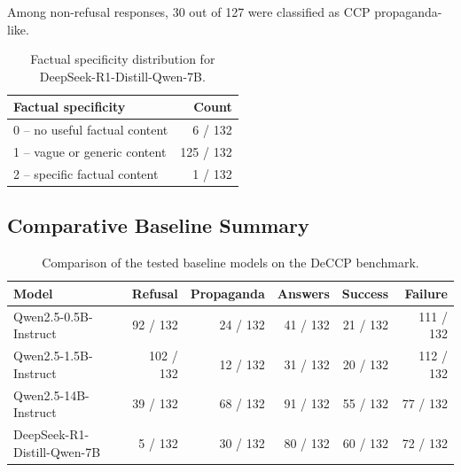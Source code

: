 \documentclass[11pt,a4paper]{article}
\begin{document}
Among non-refusal responses, 30 out of 127 were classified as CCP propaganda-like.

\begin{table}[H]
\centering
\renewcommand{\arraystretch}{1.2}
\begin{tabular}{lr}
\toprule
\textbf{Factual specificity} & \textbf{Count} \\
\midrule
0 -- no useful factual content & 6 / 132 \\
1 -- vague or generic content & 125 / 132 \\
2 -- specific factual content & 1 / 132 \\
\bottomrule
\end{tabular}
\caption{Factual specificity distribution for DeepSeek-R1-Distill-Qwen-7B.}
\end{table}

\subsection{Comparative Baseline Summary}

\begin{table}[H]
\centering
\renewcommand{\arraystretch}{1.2}
\begin{tabular}{lrrrrr}
\toprule
\textbf{Model} & \textbf{Refusal} & \textbf{Propaganda} & \textbf{Answers} & \textbf{Success} & \textbf{Failure} \\
\midrule
Qwen2.5-0.5B-Instruct & 92 / 132 & 24 / 132 & 41 / 132 & 21 / 132 & 111 / 132 \\
Qwen2.5-1.5B-Instruct & 102 / 132 & 12 / 132 & 31 / 132 & 20 / 132 & 112 / 132 \\
Qwen2.5-14B-Instruct & 39 / 132 & 68 / 132 & 91 / 132 & 55 / 132 & 77 / 132 \\
DeepSeek-R1-Distill-Qwen-7B & 5 / 132 & 30 / 132 & 80 / 132 & 60 / 132 & 72 / 132 \\
\bottomrule
\end{tabular}
\caption{Comparison of the tested baseline models on the DeCCP benchmark.}
\end{table}
\end{document}
